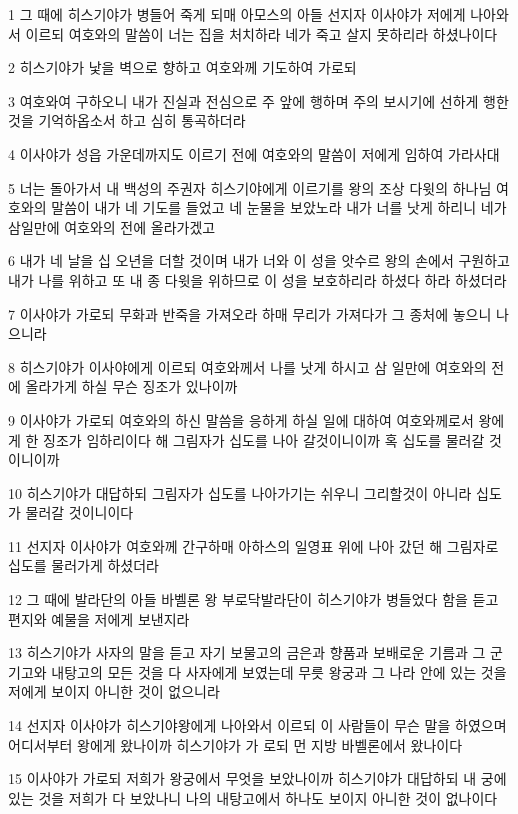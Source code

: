 \par 1 그 때에 히스기야가 병들어 죽게 되매 아모스의 아들 선지자 이사야가 저에게 나아와서 이르되 여호와의 말씀이 너는 집을 처치하라 네가 죽고 살지 못하리라 하셨나이다
\par 2 히스기야가 낯을 벽으로 향하고 여호와께 기도하여 가로되
\par 3 여호와여 구하오니 내가 진실과 전심으로 주 앞에 행하며 주의 보시기에 선하게 행한 것을 기억하옵소서 하고 심히 통곡하더라
\par 4 이사야가 성읍 가운데까지도 이르기 전에 여호와의 말씀이 저에게 임하여 가라사대
\par 5 너는 돌아가서 내 백성의 주권자 히스기야에게 이르기를 왕의 조상 다윗의 하나님 여호와의 말씀이 내가 네 기도를 들었고 네 눈물을 보았노라 내가 너를 낫게 하리니 네가 삼일만에 여호와의 전에 올라가겠고
\par 6 내가 네 날을 십 오년을 더할 것이며 내가 너와 이 성을 앗수르 왕의 손에서 구원하고 내가 나를 위하고 또 내 종 다윗을 위하므로 이 성을 보호하리라 하셨다 하라 하셨더라
\par 7 이사야가 가로되 무화과 반죽을 가져오라 하매 무리가 가져다가 그 종처에 놓으니 나으니라
\par 8 히스기야가 이사야에게 이르되 여호와께서 나를 낫게 하시고 삼 일만에 여호와의 전에 올라가게 하실 무슨 징조가 있나이까
\par 9 이사야가 가로되 여호와의 하신 말씀을 응하게 하실 일에 대하여 여호와께로서 왕에게 한 징조가 임하리이다 해 그림자가 십도를 나아 갈것이니이까 혹 십도를 물러갈 것이니이까
\par 10 히스기야가 대답하되 그림자가 십도를 나아가기는 쉬우니 그리할것이 아니라 십도가 물러갈 것이니이다
\par 11 선지자 이사야가 여호와께 간구하매 아하스의 일영표 위에 나아 갔던 해 그림자로 십도를 물러가게 하셨더라
\par 12 그 때에 발라단의 아들 바벨론 왕 부로닥발라단이 히스기야가 병들었다 함을 듣고 편지와 예물을 저에게 보낸지라
\par 13 히스기야가 사자의 말을 듣고 자기 보물고의 금은과 향품과 보배로운 기름과 그 군기고와 내탕고의 모든 것을 다 사자에게 보였는데 무릇 왕궁과 그 나라 안에 있는 것을 저에게 보이지 아니한 것이 없으니라
\par 14 선지자 이사야가 히스기야왕에게 나아와서 이르되 이 사람들이 무슨 말을 하였으며 어디서부터 왕에게 왔나이까 히스기야가 가 로되 먼 지방 바벨론에서 왔나이다
\par 15 이사야가 가로되 저희가 왕궁에서 무엇을 보았나이까 히스기야가 대답하되 내 궁에 있는 것을 저희가 다 보았나니 나의 내탕고에서 하나도 보이지 아니한 것이 없나이다
